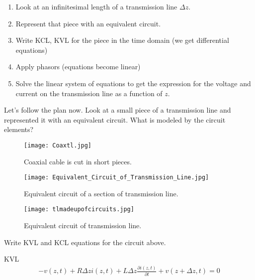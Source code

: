 \documentclass{ximera}
\begin{document}
\begin{enumerate}
\item Look at an infinitesimal length of a transmission line $\Delta z$.  

\item Represent that piece with an equivalent circuit. 

\item Write KCL, KVL for the piece in the time domain (we get
differential equations)

\item Apply phasors (equations become linear)

\item Solve the linear system of equations to get the expression for
the voltage and current on the transmission line as a function of $z$.

\end{enumerate}


Let's follow the plan now. Look at a small piece of a transmission line and represented it with an equivalent circuit. What is
modeled by the circuit elements?



\begin{figure}[htbp]
\begin{center}
\texttt{[image: Coaxtl.jpg]}
\caption{Coaxial cable is cut in short pieces.}
\label{lineeqcPieces}
\end{center}
\end{figure}

\begin{figure}[htbp]
\begin{center}
\texttt{[image: Equivalent\_Circuit\_of\_Transmission\_Line.jpg]}
\caption{Equivalent circuit of a section of transmission line.}
\label{lineeqcOnePiece}
\end{center}
\end{figure}

\begin{figure}[htbp]
\begin{center}
\texttt{[image: tlmadeupofcircuits.jpg]}
\end{center}
\caption{Equivalent circuit of transmission line.}
\label{lineeqc}
\end{figure}



Write  KVL and KCL equations for the circuit above.

KVL
\begin{eqnarray}
-v(z,t) + R \Delta z  i(z,t) + L \Delta z \frac{\partial
 i(z,t)}{\partial t} + v(z+ \Delta z,t) = 0 \nonumber
\end{eqnarray}
\end{document}
